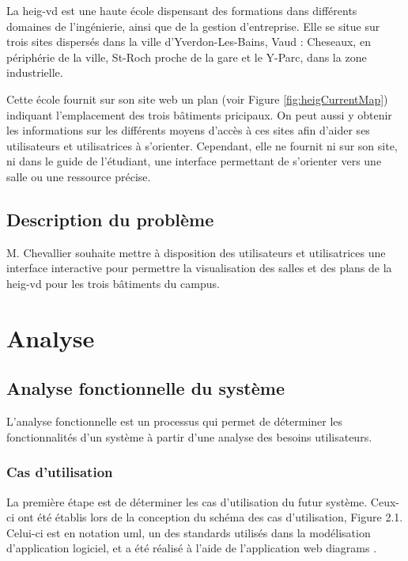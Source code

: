 \documentclass[
    iai, %
    il, %
]{heig-tb}
\begin{document}
La \gls{heig-vd} est une haute école dispensant des formations dans différents domaines de l'ingénierie, ainsi que de la gestion d'entreprise.
Elle se situe sur trois sites dispersés dans la ville d'Yverdon-Les-Bains, Vaud
: Cheseaux, en périphérie de la ville, St-Roch proche de la gare et le Y-Parc, dans la zone industrielle.

Cette école fournit sur son site web un plan \cite{plan-heig} (voir Figure \ref{fig:heigCurrentMap}) indiquant l'emplacement des trois bâtiments pricipaux.
On peut aussi y obtenir les informations sur les différents moyens d'accès à ces sites afin d'aider ses utilisateurs et  utilisatrices à s'orienter.
Cependant, elle ne fournit ni sur son site, ni dans le guide de l'étudiant, une interface permettant de s'orienter vers une salle ou une ressource précise.

\section{Description du problème}
M. Chevallier souhaite mettre à disposition des utilisateurs et utilisatrices une interface interactive pour permettre la visualisation des salles et des plans de la \gls{heig-vd} pour les trois bâtiments du campus.

\chapter{Analyse}
\section{Analyse fonctionnelle du système}
L'analyse fonctionnelle est un processus qui permet de déterminer les fonctionnalités d'un système à partir d'une analyse des besoins utilisateurs.

\subsection{Cas d'utilisation}
La première étape est de déterminer les cas d'utilisation du futur système.
Ceux-ci ont été établis lors de la conception du schéma des cas d'utilisation, Figure 2.1.
Celui-ci est en notation \gls{uml}, un des standards utilisés dans la modélisation d'application logiciel,
et a été réalisé à l'aide de l'application web \gls{diagrams} \cite{diagrams}.

\end{document}
